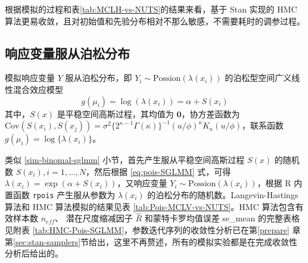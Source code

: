\documentclass[12pt,a4paper,UTF8,twoside]{book}
\theoremstyle{definition}
\theoremstyle{definition}
\theoremstyle{definition}
\theoremstyle{remark}
\begin{document}
根据模拟的过程和表\ref{tab:MCLH-vs-NUTS}的结果来看，基于 Stan 实现的 HMC
算法更易收敛，且对初始值和先验分布相对不那么敏感，不需要耗时的调参过程。

\hypertarget{possion-sglmm}{%
\subsection{响应变量服从泊松分布}\label{possion-sglmm}}

模拟响应变量 \(Y\) 服从泊松分布，即
\(Y_i \sim \mathrm{Possion}(\lambda(x_{i}))\)
的泊松型空间广义线性混合效应模型 \begin{equation}
g(\mu_i) = \log(\lambda(x_i)) = \alpha + S(x_i) \label{eq:pois-SGLMM}
\end{equation} \noindent 其中，\(S(x)\) 是平稳空间高斯过程，其均值为
\(\mathbf{0}\)，协方差函数为
\(\mathrm{Cov}(S(x_i),S(x_j)) = \sigma^2 \big\{2^{\kappa-1}\Gamma(\kappa)\big\}^{-1}(u/\phi)^{\kappa}K_{\kappa}(u/\phi)\)，联系函数
\(g(\mu_i) = \log\{\lambda(x_{i})\}\)。

类似 \ref{sim-binomal-sglmm} 小节，首先产生服从平稳空间高斯过程 \(S(x)\)
的随机数 \(S(x_i),i=1,\ldots,N\)，然后根据 \eqref{eq:pois-SGLMM} 式，可得
\(\lambda(x_i) = \exp(\alpha + S(x_i))\)，又响应变量
\(Y_i \sim \mathrm{Possion}(\lambda(x_{i}))\)，根据 R 内置函数
\texttt{rpois} 产生服从参数为 \(\lambda(x_i)\)
的泊松分布的随机数。Langevin-Hastings 算法和 HMC 算法模拟的结果见表
\ref{tab:Pois-MCLV-vs-NUTS}。HMC 算法包含有效样本数 \(n_{eff}\)、
潜在尺度缩减因子 \(\hat{R}\) 和蒙特卡罗均值误差 se\_mean
的完整表格见附表
\ref{tab:HMC-Pois-SGLMM}，参数迭代序列的收敛性分析已在第\ref{prepare}
章第\ref{sec:stan-samplers}节给出，这里不再赘述，所有的模拟实验都是在完成收敛性分析后给出的。
\end{document}
